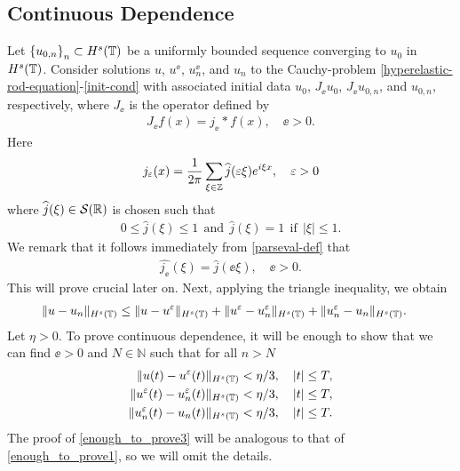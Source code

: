 \subsection{Continuous Dependence}
Let $\left\{ u_{0, n} \right\}_n \subset H^s(\mathbb{T})$ be a uniformly bounded
sequence converging to $u_0$ in $H^s(\mathbb{T})$.
Consider solutions $u $, $u^\ee$, $u^\ee_n$, and $u_n$ to the 
Cauchy-problem
\eqref{hyperelastic-rod-equation}-\eqref{init-cond}
with associated initial data $u_0$, $J_\ee u_0$,
$J_\ee u_{0,n}$, and $u_{0,n}$, respectively, where $J_\ee$ is the operator 
defined by
\begin{equation}
\label{0'u}
\begin{split}
J_\ee f(x) = j_\ee * f(x), \quad \ee>0.
\end{split}
\end{equation}
%
%
Here
\begin{equation}
\begin{split}
j_\varepsilon (x) = \frac{1}{2 \pi}\sum_{\xi \in \mathbb{Z}}
\widehat{j}(\varepsilon \xi) e^{i \xi x}, \quad \varepsilon > 0
\label{parseval-def}
\end{split}
\end{equation}
where $\widehat{j}(\xi) \in \mathcal{S}(\mathbb{R})$ is chosen such that 
%
\begin{equation}
\label{0u}
\begin{split}
	 0 \le \widehat{j}(\xi) \le 1  \ \ \text{and} \ \
 \widehat{j}(\xi) = 1 \ \ \text{if} \ \ |\xi| \le 1.
\end{split}
\end{equation}
%
%
%
%
%
%
%
%
%
%
We remark that it follows immediately from \eqref{parseval-def} that
\begin{equation}
\begin{split}
	\widehat{j_\ee}(\xi)  = \widehat{j }(\ee \xi), \quad \ee > 0.
\label{widehat-def}
\end{split}
\end{equation}
This will prove
crucial later on.
%
Next, applying
the triangle inequality, we obtain
%
%
\begin{equation*}
\begin{split}
\|u - u_n\|_{H^s(\mathbb{T})}
& \le \|u - u^\varepsilon\|_{H^s(\mathbb{T})}
+ \|u^\varepsilon - u^{\varepsilon}_n \|_{H^s(\mathbb{T}) }
+  \|u^{\varepsilon}_n - u_n \|_{H^s(\mathbb{T})}.
\end{split}
\end{equation*}
%
%
Let $\eta > 0$. To prove continuous dependence, it will be enough to show that 
we can find $\ee > 0$ and $N \in \mathbb{N}$ such that for all $n > N$ 
\begin{align}
	 \|u(t) - u^\varepsilon(t)\|_{H^s(\mathbb{T})}
	& < \eta/3, \quad |t| \le T,
\label{enough_to_prove1}
\\
  \|u^\varepsilon(t) - u^{\varepsilon}_n(t)
\|_{H^s(\mathbb{T})} & < \eta/3, \quad |t| \le T,
\label{enough_to_prove2}
\\
  \|u^{\varepsilon}_n(t) - u_n(t) \|_{H^s(\mathbb{T})} & < \eta/3, \quad |t| \le T.
\label{enough_to_prove3}
\end{align}
%
%
The proof of \eqref{enough_to_prove3} will be analogous to that of 
\eqref{enough_to_prove1}, so we will omit the details.
%
%
%
%

